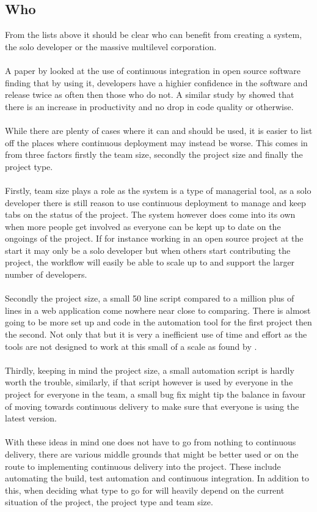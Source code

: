 \subsection{Who}

From the lists above it should be clear who can benefit from creating a system, the solo developer or the massive multilevel corporation.
\\\\
A paper by \cite{ossuse} looked at the use of continuous integration in open source software finding that by using it, developers have a highier confidence in the software and release twice as often then those who do not. A similar study by \cite{ossprod} showed that there is an increase in productivity and no drop in code quality or otherwise.
\\\\
While there are plenty of cases where it can and should be used, it is easier to list off the places where continuous deployment may instead be worse. This comes in from three factors firstly the team size, secondly the project size and finally the project type.
\\\\
Firstly, team size plays a role as the system is a type of managerial tool, as a solo developer there is still reason to use continuous deployment to manage and keep tabs on the status of the project. The system however does come into its own when more people get involved as everyone can be kept up to date on the ongoings of the project. If for instance working in an open source project at the start it may only be a solo developer but when others start contributing the project, the workflow will easily be able to scale up to and support the larger number of developers.
\\\\
Secondly the project size, a small 50 line script compared to a million plus of lines in a web application come nowhere near close to comparing. There is almost going to be more set up and code in the automation tool for the first project then the second. Not only that but it is very a inefficient use of time and effort as the tools are not designed to work at this small of a scale as found by \cite{smallci}.
\\\\
Thirdly, keeping in mind the project size, a small automation script is hardly worth the trouble, similarly, if that script however is used by everyone in the project for everyone in the team, a small bug fix  might tip the balance in favour of moving towards continuous delivery to make sure that everyone is using the latest version. 
\\\\
With these ideas in mind one does not have to go from nothing to continuous delivery, there are various middle grounds that might be better used or on the route to implementing continuous delivery into the project. These include automating the build, test automation and continuous integration. In addition to this, when deciding what type to go for will heavily depend on the current situation of the project, the project type and team size.

